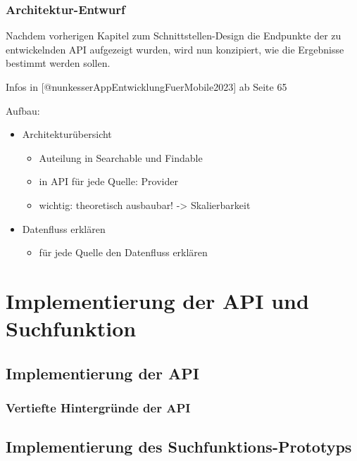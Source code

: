 \documentclass[
  12pt,
  a4paperpaper,
]{report}
\providecommand{\tightlist}{%
  \setlength{\itemsep}{0pt}\setlength{\parskip}{0pt}}
\begin{document}
\subsection{Architektur-Entwurf}\label{architektur-entwurf}

Nachdem vorherigen Kapitel zum Schnittstellen-Design die Endpunkte der
zu entwickelnden API aufgezeigt wurden, wird nun konzipiert, wie die
Ergebnisse bestimmt werden sollen.

Infos in {[}@nunkesserAppEntwicklungFuerMobile2023{]} ab Seite 65

Aufbau:

\begin{itemize}
\tightlist
\item
  Architekturübersicht

  \begin{itemize}
  \tightlist
  \item
    Auteilung in Searchable und Findable
  \item
    in API für jede Quelle: Provider
  \item
    wichtig: theoretisch ausbaubar! -\textgreater{} Skalierbarkeit
  \end{itemize}
\item
  Datenfluss erklären

  \begin{itemize}
  \tightlist
  \item
    für jede Quelle den Datenfluss erklären
  \end{itemize}
\end{itemize}

\chapter{Implementierung der API und
Suchfunktion}\label{implementierung-der-api-und-suchfunktion}

\section{Implementierung der API}\label{implementierung-der-api}

\subsection{Vertiefte Hintergründe der
API}\label{vertiefte-hintergruxfcnde-der-api}

\section{Implementierung des
Suchfunktions-Prototyps}\label{implementierung-des-suchfunktions-prototyps}
\end{document}
